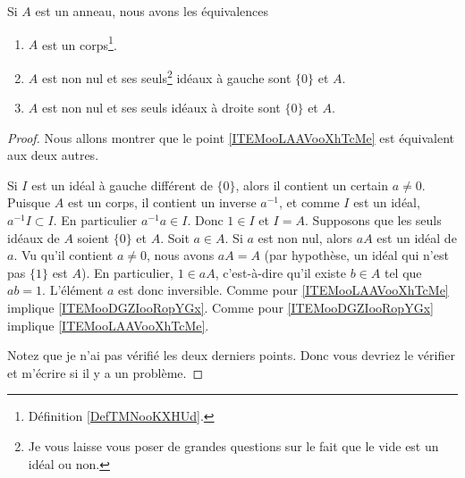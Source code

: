 \begin{proposition}     \label{AnnCorpsIdeal}\label{PROPooUOCVooZGAVVk}
	Si \( A\) est un anneau, nous avons les équivalences
	\begin{enumerate}
		\item       \label{ITEMooLAAVooXhTcMe}
		      \( A\) est un corps\footnote{Définition \ref{DefTMNooKXHUd}.}.
		\item       \label{ITEMooDGZIooRopYGx}
		      \( A\) est non nul et ses seuls\footnote{Je vous laisse vous poser de grandes questions sur le fait que le vide est un idéal ou non.} idéaux à gauche sont \( \{ 0 \}\) et \( A\).
		\item       \label{ITEMooLPWHooDJpTbR}
		      \( A\) est non nul et ses seuls idéaux à droite sont \( \{ 0 \}\) et \( A\).
	\end{enumerate}
\end{proposition}

\begin{proof}
	Nous allons montrer que le point \ref{ITEMooLAAVooXhTcMe} est équivalent aux deux autres.
	\begin{subproof}
		Si \( I\) est un idéal à gauche différent de \( \{ 0 \}\), alors il contient un certain \( a\neq 0\). Puisque \( A\) est un corps, il contient un inverse \( a^{-1}\), et comme \( I\) est un idéal, \( a^{-1} I\subset I\). En particulier \( a^{-1}a\in I\). Donc \( 1\in I\) et \( I=A\).
        Supposons que les seuls idéaux de \( A\) soient \( \{ 0 \}\) et \( A\). Soit \( a\in A\). Si \( a\) est non nul, alors \( aA\) est un idéal de \( a\). Vu qu'il contient \( a\neq 0\), nous avons \( aA=A\) (par hypothèse, un idéal qui n'est pas \( \{ 1 \}\) est \( A\)). En particulier, \( 1\in aA\), c'est-à-dire qu'il existe \( b\in A\) tel que \( ab=1\). L'élément \( a\) est donc inversible.
        Comme pour \ref{ITEMooLAAVooXhTcMe} implique \ref{ITEMooDGZIooRopYGx}. 
        Comme pour \ref{ITEMooDGZIooRopYGx} implique \ref{ITEMooLAAVooXhTcMe}.
	\end{subproof}
    Notez que je n'ai pas vérifié les deux derniers points. Donc vous devriez le vérifier et m'écrire si il y a un problème.
\end{proof}

